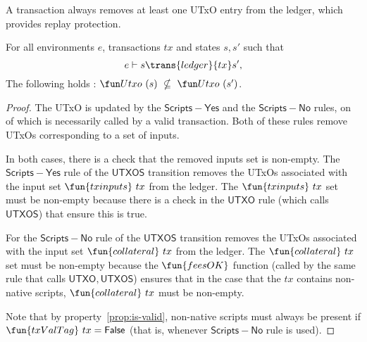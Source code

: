 \begin{property}
  \label{prop:replay}

A transaction always removes at least one UTxO entry from the ledger, which provides
replay protection.

\begin{lemma}
  For all environments $e$, transactions $tx$ and states $s, s'$ such that
  \begin{equation*}
    e\vdash s\trans{ledger}{tx}s',
  \end{equation*}
  The following holds : $\Utxo~(s)~\nsubseteq~\Utxo~(s')$.
\end{lemma}
\begin{proof}
  The UTxO is updated by the $\mathsf{Scripts{-}Yes}$ and the $\mathsf{Scripts{-}No}$
  rules, on of which is necessarily called by a valid transaction. Both of these
  rules remove UTxOs corresponding to a set of inputs.

  In both cases, there is a check that the removed inputs set is non-empty.
  The $\mathsf{Scripts{-}Yes}$ rule of the $\mathsf{UTXOS}$ transition
  removes the UTxOs associated with the input set $\fun{txinputs}~{tx}$ from the ledger.
  The $\fun{txinputs}~{tx}$ set must be non-empty because there is a check in the
  $\mathsf{UTXO}$ rule (which calls $\mathsf{UTXOS}$) that ensure this is true.

  For the $\mathsf{Scripts{-}No}$ rule of the $\mathsf{UTXOS}$ transition
  removes the UTxOs associated with the input set $\fun{collateral}~{tx}$ from the ledger.
  The $\fun{collateral}~{tx}$ set must be non-empty because
  the $\fun{feesOK}$ function (called by the same rule that calls $\mathsf{UTXO},
  \mathsf{UTXOS}$) ensures that in the case that the $tx$ contains non-native scripts,
  $\fun{collateral}~{tx}$ must be non-empty.

  Note that by property~\ref{prop:is-valid}, non-native scripts must always be present
  if $\fun{txValTag}~tx = \False$ (that is, whenever $\mathsf{Scripts{-}No}$ rule is used).
\end{proof}
\end{property}

